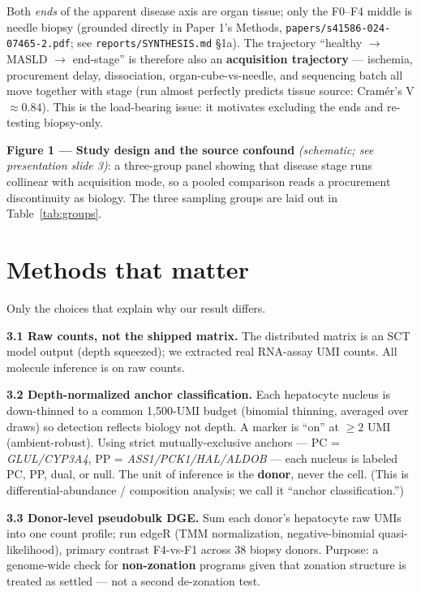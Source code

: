 \documentclass[11pt,a4paper]{article}
\begin{document}
Both \emph{ends} of the apparent disease axis are organ tissue; only the F0--F4 middle is needle biopsy (grounded directly in Paper 1's Methods, \texttt{papers/s41586-024-07465-2.pdf}; see \texttt{reports/SYNTHESIS.md} \S1a). The trajectory ``healthy $\to$ MASLD $\to$ end-stage'' is therefore also an \textbf{acquisition trajectory} --- ischemia, procurement delay, dissociation, organ-cube-vs-needle, and sequencing batch all move together with stage (run almost perfectly predicts tissue source: Cram\'er's V $\approx 0.84$). This is the load-bearing issue: it motivates excluding the ends and re-testing biopsy-only.

\textbf{Figure 1 --- Study design and the source confound} \emph{(schematic; see presentation slide 3)}: a three-group panel showing that disease stage runs collinear with acquisition mode, so a pooled comparison reads a procurement discontinuity as biology. The three sampling groups are laid out in Table~\ref{tab:groups}.

\section{Methods that matter}

Only the choices that explain why our result differs.

\textbf{3.1 Raw counts, not the shipped matrix.} The distributed matrix is an SCT model output (depth squeezed); we extracted real RNA-assay UMI counts. All molecule inference is on raw counts.

\textbf{3.2 Depth-normalized anchor classification.} Each hepatocyte nucleus is down-thinned to a common 1{,}500-UMI budget (binomial thinning, averaged over draws) so detection reflects biology not depth. A marker is ``on'' at $\ge 2$ UMI (ambient-robust). Using strict mutually-exclusive anchors --- PC = \emph{GLUL/CYP3A4}, PP = \emph{ASS1/PCK1/HAL/ALDOB} --- each nucleus is labeled PC, PP, dual, or null. The unit of inference is the \textbf{donor}, never the cell. (This is differential-abundance / composition analysis; we call it ``anchor classification.'')

\textbf{3.3 Donor-level pseudobulk DGE.} Sum each donor's hepatocyte raw UMIs into one count profile; run edgeR (TMM normalization, negative-binomial quasi-likelihood), primary contrast F4-vs-F1 across 38 biopsy donors. Purpose: a genome-wide check for \textbf{non-zonation} programs given that zonation structure is treated as settled --- not a second de-zonation test.
\end{document}
